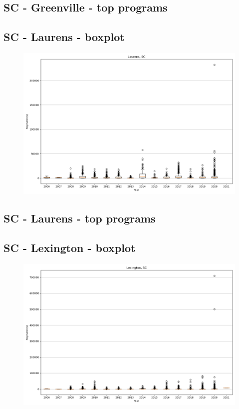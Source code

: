 \subsection*{SC - Greenville - top programs}

\newpage
\subsection*{SC - Laurens - boxplot}
\begin{figure}[h]
\centering
\includegraphics[width=7in]{../output/boxplots/counties/Laurens-SC_boxplot.png}
\end{figure}


\subsection*{SC - Laurens - top programs}

\newpage
\subsection*{SC - Lexington - boxplot}
\begin{figure}[h]
\centering
\includegraphics[width=7in]{../output/boxplots/counties/Lexington-SC_boxplot.png}
\end{figure}


